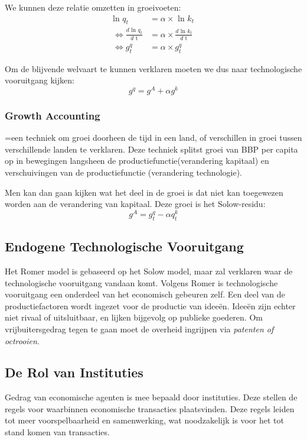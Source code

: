 We kunnen deze relatie omzetten in groeivoeten:
\begin{align*}
  \text{ln } q_t &= \alpha \times \text{ ln } k_t \\
  \Leftrightarrow \frac{d \text{ ln } q_t}{d \text{ t}} &= \alpha \times \frac{d \text{ ln } k_t}{d \text{ t}} \\
  \Leftrightarrow g_t^q &= \alpha \times g_t^q
\end{align*}

Om de blijvende welvaart te kunnen verklaren moeten we dus naar technologische vooruitgang kijken:
\begin{equation}
  g^q = g^A +\alpha g^k
\end{equation}

\subsubsection{Growth Accounting}
=een techniek om groei doorheen de tijd in een land, of verschillen in groei tussen verschillende landen te verklaren. Deze techniek splitst groei van BBP per capita op in bewegingen langsheen de productiefunctie(verandering kapitaal) en verschuivingen van de productiefunctie (verandering technologie).

Men kan dan gaan kijken wat het deel in de groei is dat niet kan toegewezen worden aan de verandering van kapitaal. Deze groei is het Solow-residu:
\begin{equation}
  g^A = g^q_t - \alpha q^k_t
\end{equation}

\subsection{Endogene Technologische Vooruitgang}
Het Romer model is gebaseerd op het Solow model, maar zal verklaren waar de technologische vooruitgang vandaan komt. Volgens Romer is technologische vooruitgang een onderdeel van het economisch gebeuren zelf. Een deel van de productiefactoren wordt ingezet voor de productie van idee\"en. Idee\"en zijn echter niet rivaal of uitsluitbaar, en lijken bijgevolg op publieke goederen. Om vrijbuitersgedrag tegen te gaan moet de overheid ingrijpen via \textit{patenten of octrooien}.

\subsection{De Rol van Instituties}
Gedrag van economische agenten is mee bepaald door instituties. Deze stellen de regels voor waarbinnen economische transacties plaatsvinden. Deze regels leiden tot meer voorspelbaarheid en samenwerking, wat noodzakelijk is voor het tot stand komen van transacties.
